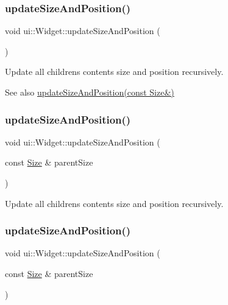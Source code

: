 \subsubsection{\texorpdfstring{update\+Size\+And\+Position()}{updateSizeAndPosition()}\hspace{0.1cm}{\footnotesize\ttfamily [2/4]}}
{\footnotesize\ttfamily void ui\+::\+Widget\+::update\+Size\+And\+Position (\begin{DoxyParamCaption}{ }\end{DoxyParamCaption})}

Update all children\textquotesingle{}s contents size and position recursively. \begin{DoxySeeAlso}{See also}
{\ttfamily \hyperlink{classui_1_1Widget_a77fcdcda9d9affafe2a16e369ae8fb05}{update\+Size\+And\+Position(const Size\&)}} 
\end{DoxySeeAlso}
\mbox{\label{classui_1_1Widget_a77fcdcda9d9affafe2a16e369ae8fb05}} 
\subsubsection{\texorpdfstring{update\+Size\+And\+Position()}{updateSizeAndPosition()}\hspace{0.1cm}{\footnotesize\ttfamily [3/4]}}
{\footnotesize\ttfamily void ui\+::\+Widget\+::update\+Size\+And\+Position (\begin{DoxyParamCaption}\item[{const \hyperlink{classSize}{Size} \&}]{parent\+Size }\end{DoxyParamCaption})}

Update all children\textquotesingle{}s contents size and position recursively. \mbox{\label{classui_1_1Widget_a77fcdcda9d9affafe2a16e369ae8fb05}} 
\subsubsection{\texorpdfstring{update\+Size\+And\+Position()}{updateSizeAndPosition()}\hspace{0.1cm}{\footnotesize\ttfamily [4/4]}}
{\footnotesize\ttfamily void ui\+::\+Widget\+::update\+Size\+And\+Position (\begin{DoxyParamCaption}\item[{const \hyperlink{classSize}{Size} \&}]{parent\+Size }\end{DoxyParamCaption})}

